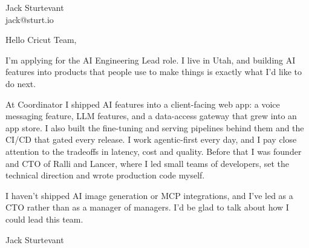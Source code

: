 \documentclass[11pt]{article}
\begin{document}
\raggedright

{\namefont\fontsize{20pt}{24pt}\selectfont Jack Sturtevant}\\[-0.3em]
jack@sturt.io

\vspace{1.2em}

Hello Cricut Team,

I'm applying for the AI Engineering Lead role. I live in Utah, and building AI features into products that people use to make things is exactly what I'd like to do next.

At Coordinator I shipped AI features into a client-facing web app: a voice messaging feature, LLM features, and a data-access gateway that grew into an app store. I also built the fine-tuning and serving pipelines behind them and the CI/CD that gated every release. I work agentic-first every day, and I pay close attention to the tradeoffs in latency, cost and quality. Before that I was founder and CTO of Ralli and Lancer, where I led small teams of developers, set the technical direction and wrote production code myself.

I haven't shipped AI image generation or MCP integrations, and I've led as a CTO rather than as a manager of managers. I'd be glad to talk about how I could lead this team.

\vspace{0.6em}
Jack Sturtevant
\end{document}

